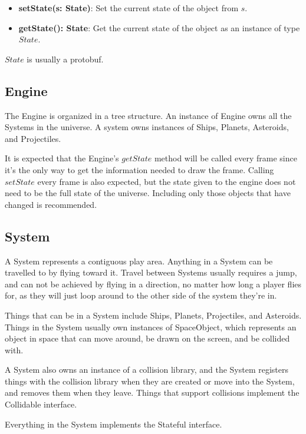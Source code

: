\documentclass{article}
\begin{document}
\begin{itemize}
\item[]\textbf{setState(s: State)}: Set the current state of the object from $s$.
\item[]\textbf{getState(): State}: Get the current state of the object as an instance of type $State$.
\end{itemize}

$State$ is usually a protobuf.


\subsection{Engine}
The Engine is organized in a tree structure. An instance of Engine owns all the Systems in the universe. A system owns instances of Ships, Planets, Asteroids, and Projectiles.

It is expected that the Engine's $getState$ method will be called every frame since it's the only way to get the information needed to draw the frame. Calling $setState$ every frame is also expected, but the state given to the engine does not need to be the full state of the universe. Including only those objects that have changed is recommended.

\subsection{System}
A System represents a contiguous play area. Anything in a System can be travelled to by flying toward it. Travel between Systems usually requires a jump, and can not be achieved by flying in a direction, no matter how long a player flies for, as they will just loop around to the other side of the system they're in.

Things that can be in a System include Ships, Planets, Projectiles, and Asteroids. Things in the System usually own instances of SpaceObject, which represents an object in space that can move around, be drawn on the screen, and be collided with. 

A System also owns an instance of a collision library, and the System registers things with the collision library when they are created or move into the System, and removes them when they leave. Things that support collisions implement the Collidable interface.

Everything in the System implements the Stateful interface.
\end{document}
